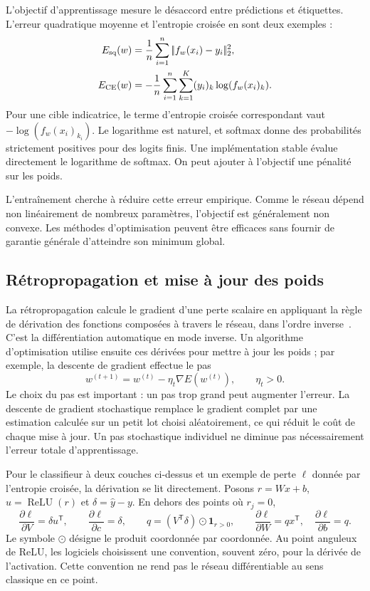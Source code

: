 L'objectif d'apprentissage mesure le désaccord entre prédictions et étiquettes. L'erreur quadratique moyenne et l'entropie croisée en sont deux exemples :
\begin{align}
 E_{\mathrm{sq}}(w)&=\frac1n\sum_{i=1}^n|\!| f_w(x_i)-y_i |\!|_2^2,\label{eq-nn-square}\\
 E_{\mathrm{CE}}(w)&=-\frac1n\sum_{i=1}^n\sum_{k=1}^K(y_i)_k\log(f_w(x_i)_k).
 \label{eq-nn-ce}
\end{align}
Pour une cible indicatrice, le terme d'entropie croisée correspondant vaut $-\log(f_w(x_i)_{k_i})$. Le logarithme est naturel, et softmax donne des probabilités strictement positives pour des logits finis. Une implémentation stable évalue directement le logarithme de softmax. On peut ajouter à l'objectif une pénalité sur les poids.

L'entraînement cherche à réduire cette erreur empirique. Comme le réseau dépend non linéairement de nombreux paramètres, l'objectif est généralement non convexe. Les méthodes d'optimisation peuvent être efficaces sans fournir de garantie générale d'atteindre son minimum global.

\subsection{Rétropropagation et mise à jour des poids}
La rétropropagation calcule le gradient d'une perte scalaire en appliquant la règle de dérivation des fonctions composées à travers le réseau, dans l'ordre inverse~\cite{rumelhart1986learning,linnainmaa1976taylor}. C'est la différentiation automatique en mode inverse. Un algorithme d'optimisation utilise ensuite ces dérivées pour mettre à jour les poids ; par exemple, la descente de gradient effectue le pas
\[
 w^{(t+1)}=w^{(t)}-\eta_t\nabla E(w^{(t)}),\qquad \eta_t>0.
\]
Le choix du pas est important : un pas trop grand peut augmenter l'erreur. La descente de gradient stochastique remplace le gradient complet par une estimation calculée sur un petit lot choisi aléatoirement, ce qui réduit le coût de chaque mise à jour. Un pas stochastique individuel ne diminue pas nécessairement l'erreur totale d'apprentissage.

Pour le classifieur à deux couches ci-dessus et un exemple de perte $\ell$ donnée par l'entropie croisée, la dérivation se lit directement. Posons $r=Wx+b$, $u=\operatorname{ReLU}(r)$ et $\delta=\hat y-y$. En dehors des points où $r_j=0$,
\[
 \frac{\partial\ell}{\partial V}=\delta u^\mathsf{T},\qquad
 \frac{\partial\ell}{\partial c}=\delta,\qquad
 q=(V^\mathsf{T}\delta)\odot\mathbf1_{r>0},\qquad
 \frac{\partial\ell}{\partial W}=qx^\mathsf{T},\quad
 \frac{\partial\ell}{\partial b}=q.
\]
Le symbole $\odot$ désigne le produit coordonnée par coordonnée. Au point anguleux de ReLU, les logiciels choisissent une convention, souvent zéro, pour la dérivée de l'activation. Cette convention ne rend pas le réseau différentiable au sens classique en ce point.

